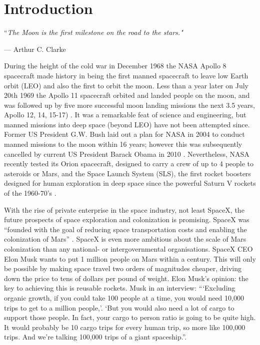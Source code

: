 \chapter{Introduction}
\epigraph{``\itshape{The Moon is the first milestone on the road to the stars.}"}{--- \textup{Arthur C. Clarke}}

During the height of the cold war in December 1968 the NASA Apollo 8 spacecraft made history in being the first manned spacecraft to leave low Earth orbit (LEO) and also the first to orbit the moon. Less than a year later on July 20th 1969 the Apollo 11 spacecraft orbited and landed people on the moon, and was followed up by five more successful moon landing missions the next 3.5 years, Apollo 12, 14, 15-17) \cite{wiki-moon-missions}. It was a remarkable feat of science and engineering, but manned missions into deep space (beyond LEO) have not been attempted since. Former US President G.W. Bush laid out a plan for NASA in 2004 to conduct manned missions to the moon within 16 years; however this was subsequently cancelled by current US President Barack Obama in 2010 \cite{cnn-bush-moon}\cite{bcc-obama-moon}. Nevertheless, NASA recently tested its Orion spacecraft, designed to carry a crew of up to 4 people to asteroids or Mars, and the Space Launch System (SLS), the first rocket boosters designed for human exploration in deep space since the powerful Saturn V rockets of the 1960-70's \cite{nasa-sls}.

With the rise of private enterprise in the space industry, not least SpaceX, the future prospects of space exploration and colonization is promising. SpaceX was “founded with the goal of reducing space transportation costs and enabling the colonization of Mars” \cite{wiki-spacex}. SpaceX is even more ambitious about the scale of Mars colonization than any national- or intergovernmental organisations. SpaceX CEO Elon Musk wants to put 1 million people on Mars within a century. This will only be possible by making space travel two orders of magnitudes cheaper, driving down the price to tens of dollars per pound of weight. Elon Musk's opinion: the key to achieving this is reusable rockets. Musk in an interview: “‘Excluding organic growth, if you could take 100 people at a time, you would need 10,000 trips to get to a million people,’. ‘But you would also need a lot of cargo to support those people. In fact, your cargo to person ratio is going to be quite high. It would probably be 10 cargo trips for every human trip, so more like 100,000 trips. And we’re talking 100,000 trips of a giant spaceship.”\cite{RossAndersen}.

